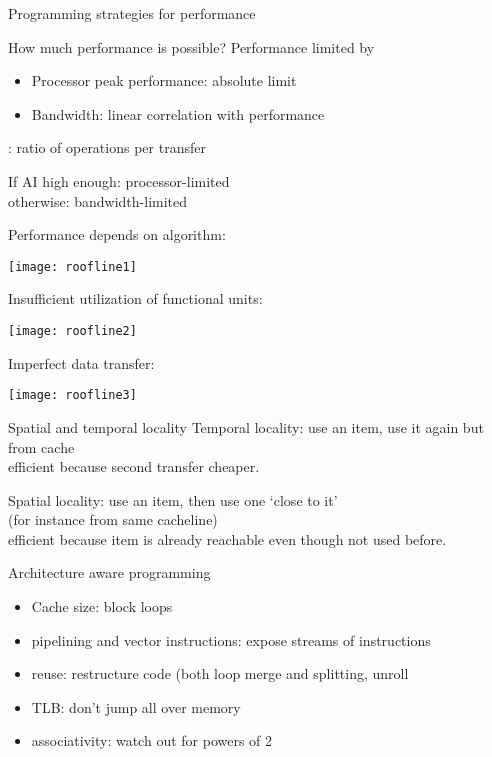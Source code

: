  {Programming strategies for performance}

\begin{numberedframe}{How much performance is possible?}
  Performance limited by
  \begin{itemize}
  \item Processor peak performance: absolute limit
  \item Bandwidth: linear correlation with performance
  \end{itemize}
  : ratio of operations per transfer

  If AI high enough: processor-limited\\
  otherwise: bandwidth-limited
\end{numberedframe}

\begin{numberedframe}
  Performance depends on algorithm:

  \texttt{[image: roofline1]}
\end{numberedframe}

\begin{numberedframe}
  Insufficient utilization of functional units:

  \texttt{[image: roofline2]}
\end{numberedframe}

\begin{numberedframe}
  Imperfect data transfer:

  \texttt{[image: roofline3]}
\end{numberedframe}

\begin{numberedframe}{Spatial and temporal locality}
  Temporal locality: use an item, use it again but from cache\\
  efficient because second transfer cheaper.

  Spatial locality: use an item, then use one `close to it'\\
  (for instance from same cacheline)\\
  efficient because item is already reachable even though not used before.
\end{numberedframe}

\begin{numberedframe}{Architecture aware programming}
  \begin{itemize}
  \item Cache size: block loops
  \item pipelining and vector instructions: expose streams of instructions
  \item reuse: restructure code (both loop merge and splitting, unroll
  \item TLB: don't jump all over memory
  \item associativity: watch out for powers of 2
  \end{itemize}
\end{numberedframe}

